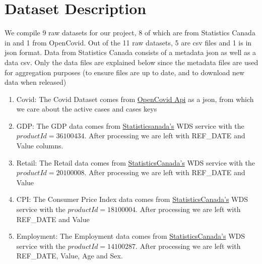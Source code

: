 \documentclass[fontsize=11pt]{article}
\begin{document}
    \section*{Dataset Description}
    We compile 9 raw datasets for our project, 8 of which are from Statistics Canada in and 1 from OpenCovid.
    Out of the 11 raw datasets, 5 are csv files and 1 is in json
    format. Data from Statistics Canada consists of a metadata json as well as a data csv. Only the data files are explained below since the metadata files are used for aggregation purposes (to ensure files are up to date, and to download new data when released)
    \begin{enumerate}
        \item Covid: The Covid Dataset comes from
        \href{https://opencovid.ca/api/}{OpenCovid Api} as a json, from which we care about the active cases and cases keys \autocite{data5}
        \item GDP: The GDP data comes from \href{ https://www150.statcan.gc.ca/t1/tbl1/en/tv.action?pid=3610043401}{Statisticsanada's} WDS service with the $productId = 36100434$. After processing we are left with REF\_DATE and Value columns. \autocite{data1}
        \item Retail: The Retail data comes from \href{https://www150.statcan.gc.ca/t1/tbl1/en/tv.action?pid=2010000801}{StatisticsCanada's} WDS service with the $productId = 20100008$. After processing we are left with REF\_DATE and Value \autocite{data2}
        \item CPI: The Consumer Price Index data comes from \href{https://www150.statcan.gc.ca/t1/tbl1/en/tv.action?pid=1810000401}{StatisticsCanada's} WDS service with the $productId = 18100004$. After processing we are left with REF\_DATE and Value \autocite{data3}
        \item Employment: The Employment data comes from \href{https://www150.statcan.gc.ca/t1/tbl1/en/tv.action?pid=1410028703}{StatisticsCanada's} WDS service with the $productId = 14100287$. After processing we are left with REF\_DATE, Value, Age and Sex. \autocite{data4}
    \end{enumerate}
    \newpage
\end{document}
